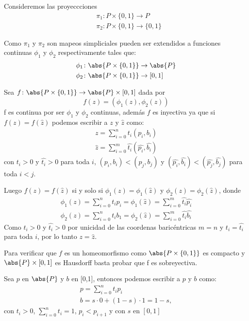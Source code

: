 \begin{Dem}

Consideremos las proyeccciones
\begin{align*}
&\pi_1\colon P\times\{0,1\} \rightarrow P\\
&\pi_2\colon P\times\{0,1\} \rightarrow \{0,1\}
\end{align*}

Como $\pi_1$ y $\pi_2$ son mapeos simpliciales pueden ser extendidos a funciones continuas $\phi_1$ y $\phi_2$ respectivamente tales que:
\begin{align*}
&\phi_1\colon\abs{P\times\{0,1\}} \rightarrow \abs{P}\\
&\phi_2\colon\abs{P\times\{0,1\}} \rightarrow [0,1]
\end{align*}

Sea $f\colon\abs{P\times \{0,1\}} \rightarrow \abs{P}\times [0,1]$ dada por 
\begin{equation*}
f(z)= (\phi_1(z),\phi_2(z))
\end{equation*}
f es continua por ser $\phi_1$ y $\phi_2$ continuas, además $f$ es inyectiva ya que si $f(z)=f(\hat{z})$ podemos escribir a $z$ y $\hat{z}$ como:
\begin{eqnarray}
z = \sum_{i=0}^{n}t_i(p_i,b_i)\\
\hat{z} = \sum_{i=0}^{m}\hat{t_i}(\hat{p_i},\hat{b_i})
\end{eqnarray} 
con $t_i>0$ y $\hat{t_i}>0$ para toda $i$, $(p_i,b_i)<(p_j,b_j)$ y $(\hat{p_i},\hat{b_i})<(\hat{p_j},\hat{b_j})$ para toda $i<j$.

Luego $f(z) = f(\hat{z})$ si y solo si $\phi_1(z)=\phi_1(\hat{z})$ y $\phi_2(z)=\phi_2(\hat{z})$, donde 
\begin{eqnarray}
\phi_1(z) = \sum_{i=0}^{n}t_ip_i = \phi_1(\hat{z}) = \sum_{i=0}^{m}\hat{t_i}\hat{p_i}\\
\phi_2(z) = \sum_{i=0}^{n}t_ib_1 = \phi_2(\hat{z}) = \sum_{i=0}^{m}\hat{t_i}\hat{b_i}
\end{eqnarray}
Como $t_i>0$ y $\hat{t_i}>0$ por unicidad de las coordenas baricéntricas $m=n$ y $t_i = \hat{t_i}$ para toda $i$, por lo tanto $z = \hat{z}$.

Para verificar que $f$ es un homeomorfismo como $\abs{P\times\{0,1\}}$ es compacto y $\abs{P}\times[0,1]$ es Hausdorff basta probar que f es sobreyectiva. 

Sea $p$ en $\abs{P}$ y $b$ en [0,1], entonces podemos escribir a $p$ y $b$ como:
\begin{eqnarray}
p = \sum_{i=0}^{n}t_ip_i \\
b = s\cdot 0 + (1-s)\cdot 1 = 1-s, 
\end{eqnarray}
con $t_i>0$, $\sum_{i=0}^{n}t_i =1$, $p_i<p_{i+1}$ y con $s$ en $[0,1]$


\end{Dem}
